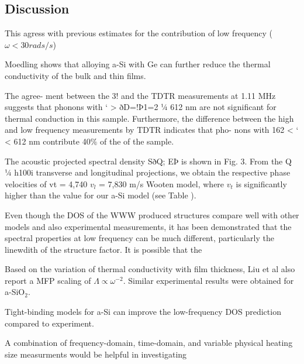\documentclass[aps,prb,twocolumn,superscriptaddress,footinbib,amsmath,amssymb,floatfix]{revtex4}
\begin{document}

\subsection{\label{S:Lifetimes}Discussion}

This agress with previous estimates for the contribution of low 
frequency ($\omega<30 rads/s$) \cite{love_estimate_1990}

Moedling shows that alloying a-Si with Ge can further reduce 
the thermal conductivity of the bulk and thin films.
\cite{bouchard_vibrational_1988,feldman_thermal_1993} 

The agree-
ment between the 3! and the TDTR measurements at
1.11 MHz suggests that phonons with ‘ > ðD=!Þ1=2 1⁄4
612 nm are not significant for thermal conduction in this
sample. Furthermore, the difference between the high and
low frequency measurements by TDTR indicates that pho-
nons with 162 < ‘ < 612 nm contribute 40$\%$ of the of
the sample.\cite{liu_high_2009}

The acoustic projected spectral density SðQ; EÞ is shown
in Fig. 3. From the Q 1⁄4 h100i transverse and longitudinal
projections, we obtain the respective phase velocities of
vt = 4,740 $v_l$ = 7,830 m/s Wooten model, where $v_t$ is 
significantly higher than the value for our a-Si model 
(see Table ).\cite{liu_high_2009} 

Even though the DOS of the WWW produced structures compare well with 
other models and also experimental measurements, it has been 
demonstrated that the spectral properties at low frequency can be 
much different, particularly the linewdith of the structure 
factor.\cite{liu_high_2009} It is possible that the 

Based on the variation of thermal conductivity with film thickness, 
Liu et al also report a MFP scaling of 
$\Lambda \propto \omega^{-2}$.\cite{liu_high_2009} Similar experimental 
results were obtained for a-SiO$_2$.
\cite{masciovecchio_evidence_2006}

Tight-binding models for a-Si can improve the low-frequency 
DOS prediction compared to experiment.\cite{feldman_tight-binding_2004}


A combination of frequency-domain, time-domain, and variable 
physical heating size measurments would be helpful in investigating
\cite{koh_frequency_2007,siemens_quasi-ballistic_2010,
minnich_thermal_2011,regner_broadband_2013}
\end{document}
